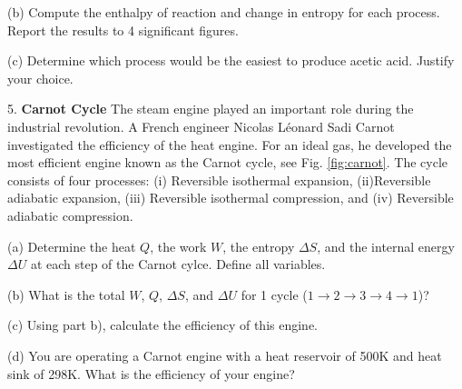 \documentclass[11pt]{article}
\begin{document}
(b) Compute the enthalpy of reaction and change in entropy for each process. Report the results
to 4 significant figures.

(c) Determine which process would be the easiest to produce acetic acid. Justify your choice.

\pagebreak

%

5. \textbf{Carnot Cycle} The steam engine played an important role during the industrial
revolution. A French engineer Nicolas L\'{e}onard Sadi Carnot investigated the efficiency
of the heat engine. For an ideal gas, he developed the most efficient engine known as the Carnot cycle, see
Fig. \ref{fig:carnot}. The cycle consists of four processes: (i) Reversible isothermal expansion,
(ii)Reversible adiabatic expansion, (iii) Reversible isothermal compression, and (iv) Reversible
adiabatic compression.

(a) Determine the heat $Q$, the work $W$, the entropy $\Delta S$, and the internal energy $\Delta U$
at each step of the Carnot cylce. Define all variables.

(b) What is the total $W$, $Q$, $\Delta S$, and $\Delta U$ for 1 cycle ($1\rightarrow 2 \rightarrow 3
\rightarrow 4 \rightarrow 1$)?

(c) Using part b), calculate the efficiency of this engine.

(d) You are operating a Carnot engine with a heat reservoir of 500K and heat sink of
298K. What is the efficiency of your engine?
\end{document}
